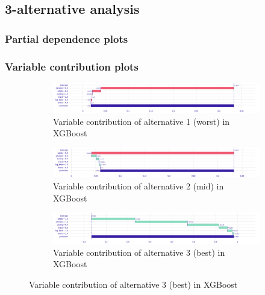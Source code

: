 \documentclass[../main.tex]{subfiles}
\begin{document}
\subsection{3-alternative analysis}
\subsubsection{Partial dependence plots}

\subsubsection{Variable contribution plots}
\begin{figure}[H]
	\centering
	\begin{subfigure}{\linewidth}
		\includegraphics[width=\linewidth]{../img/xgb-breakdown-worst.png}
		\caption{Variable contribution of alternative 1 (worst) in XGBoost}
		\label{fig:xgb-3alt1-contrib}
	\end{subfigure}
	\begin{subfigure}{\linewidth}
		\includegraphics[width=\linewidth]{../img/xgb-breakdown-mid.png}
		\caption{Variable contribution of alternative 2 (mid) in XGBoost}
		\label{fig:xgb-3alt2-contrib}
	\end{subfigure}
	\begin{subfigure}{\linewidth}
		\includegraphics[width=\linewidth]{../img/xgb-breakdown-best.png}
		\caption{Variable contribution of alternative 3 (best) in XGBoost}
		\label{fig:xgb-3alt3-contrib}
	\end{subfigure}
\end{figure}
\end{document}
